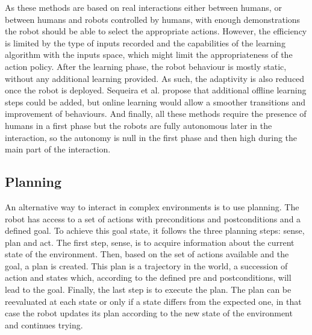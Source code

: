     As these methods are based on real interactions either between humans, or between humans and robots controlled by humans, with enough demonstrations the robot should be able to select the appropriate actions. However, the efficiency is limited by the type of inputs recorded and the capabilities of the learning algorithm with the inputs space, which might limit the appropriateness of the action policy. After the learning phase, the robot behaviour is  mostly static, without any additional learning provided. As such, the adaptivity is also reduced once the robot is deployed. Sequeira et al. propose that additional offline learning steps could be added, but online learning would allow a smoother transitions and improvement of behaviours.
    And finally, all these methods require the presence of humans in a first phase but the robots are fully autonomous later in the interaction, so the autonomy is null in the first phase and then high during the main part of the interaction.
    
\subsection{Planning} \label{ssec:planning}
    
    An alternative way to interact in complex environments is to use planning. The robot has access to a set of actions with preconditions and postconditions and a defined goal. To achieve this goal state, it follows the three planning steps: sense, plan and act. The first step, sense, is to acquire information about the current state of the environment. Then, based on the set of actions available and the goal, a plan is created. This plan is a trajectory in the world, a succession of action and states which, according to the defined pre and postconditions, will lead to the goal. Finally, the last step is to execute the plan. The plan can be reevaluated at each state or only if a state differs from the expected one, in that case the robot updates its plan according to the new state of the environment and continues trying.
    
